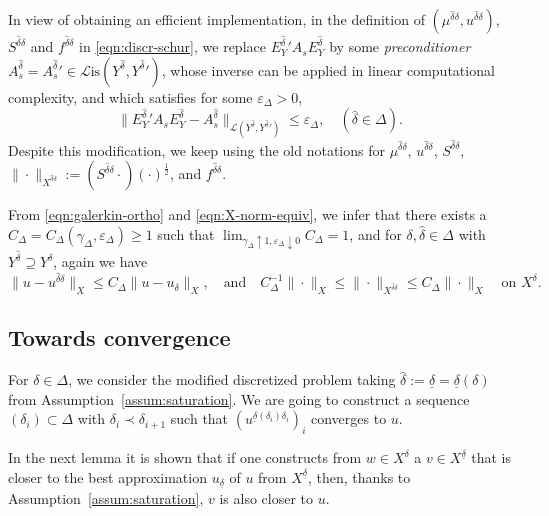 \documentclass[11pt,a4paper,oneside,english]{amsart}
\numberwithin{equation}{section}
\numberwithin{theorem}{section}
\theoremstyle{definition}
\newcommand{\eps}{\varepsilon}
\newcommand{\cL}{\mathcal L}
\newcommand{\Lis}{\cL\mathrm{is}}
\newcommand{\udelta}{{\underline{\delta}}}
\newcommand{\jw}[1]{{\color{red}{JW: #1}}}
\begin{document}
In view of obtaining an efficient implementation, in the definition of
$(\mu^{\hat{\delta} \delta},u^{\hat{\delta} \delta})$, $S^{\hat{\delta} \delta}$
and $f^{\hat{\delta} \delta}$ in \eqref{eqn:discr-schur}, we replace
${E_Y^{\hat{\delta}}}' A_s E_Y^{\hat{\delta}}$ by some \emph{preconditioner}
$A_s^{\hat{\delta}}={A_s^{\hat{\delta}}}' \in \Lis(Y^{\hat{\delta}},{Y^{\hat \delta}}')$,
whose inverse can be applied in linear computational complexity, and which satisfies for some $\eps_\Delta>0$,
\[
\|{E_Y^{\hat{\delta}}}' A_s E_Y^{\hat{\delta}}-A_s^{\hat{\delta}}\|_{\cL(Y^{\hat{\delta}},{Y^{\hat{\delta}}}')}\leq \eps_\Delta, \quad(\hat{\delta} \in \Delta).
\]
\jw{dit zou misschien een leuke numerieke test zijn, niet?}
Despite this modification, we keep using the old notations for $\mu^{\hat{\delta} \delta}$,
$u^{\hat{\delta} \delta}$, $S^{\hat{\delta} \delta}$,
$\|\cdot\|_{X^{\hat{\delta}\delta}}:=(S^{\hat{\delta}\delta}\cdot)(\cdot)^{\frac12}$,
and $f^{\hat{\delta} \delta}$.

From \eqref{eqn:galerkin-ortho} and \eqref{eqn:X-norm-equiv},
we infer that there exists a $C_\Delta=C_\Delta(\gamma_\Delta,\eps_{\Delta})\geq 1$ such that 
$\lim_{\gamma_\Delta \uparrow 1,\eps_\Delta \downarrow 0} C_\Delta = 1$, and for
$\delta,\hat{\delta} \in \Delta$ with $Y^{\hat{\delta}} \supseteq Y^\delta$, again we have
\[
  \|u-u^{\hat{\delta}\delta}\|_X \leq C_\Delta \|u-u_\delta\|_X, \quad \text{and} \quad
C_\Delta^{-1} \|\cdot\|_{X} \leq \|\cdot\|_{X^{\hat{\delta}\delta}} \leq C_\Delta \|\cdot\|_{X} \quad\text{on } X^\delta.
\]

\subsection{Towards convergence}
For $\delta \in \Delta$, we consider the modified discretized problem taking
$\hat{\delta}:=\udelta=\udelta(\delta)$ from Assumption~\ref{assum:saturation}.
We are going to construct a sequence $(\delta_i) \subset \Delta$ with $\delta_i \prec \delta_{i+1}$
such that $(u^{\udelta(\delta_i)\delta_i})_i$ converges to $u$.

In the next lemma it is shown that if one constructs from $w \in X^\delta$ a
$v \in X^\udelta$ that is closer to the best approximation $u_\udelta$ of $u$ from
$X^\udelta$, then, thanks to Assumption~\ref{assum:saturation}, $v$ is also closer to $u$.
\end{document}
